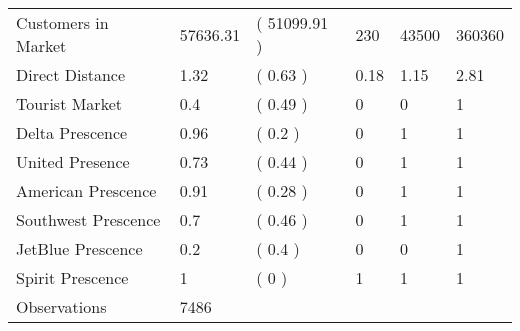 \begin{tabular}[t]{llllll}
\hspace{1em}Customers in Market & 57636.31 & ( 51099.91 ) & 230 & 43500 & 360360\\
\hspace{1em}Direct Distance & 1.32 & ( 0.63 ) & 0.18 & 1.15 & 2.81\\
\hspace{1em}Tourist Market & 0.4 & ( 0.49 ) & 0 & 0 & 1\\
\hspace{1em}Delta Prescence & 0.96 & ( 0.2 ) & 0 & 1 & 1\\
\hspace{1em}United Presence & 0.73 & ( 0.44 ) & 0 & 1 & 1\\
\hspace{1em}American Prescence & 0.91 & ( 0.28 ) & 0 & 1 & 1\\
\hspace{1em}Southwest Prescence & 0.7 & ( 0.46 ) & 0 & 1 & 1\\
\hspace{1em}JetBlue Prescence & 0.2 & ( 0.4 ) & 0 & 0 & 1\\
\hspace{1em}Spirit Prescence & 1 & ( 0 ) & 1 & 1 & 1\\
\midrule
\hspace{1em}Observations & 7486 &  &  &  & \\
\bottomrule
\end{tabular}
